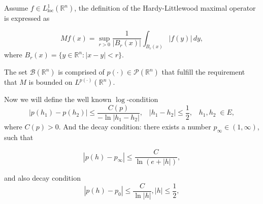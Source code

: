 \documentclass[oneside,reqno]{amsart}
\numberwithin{equation}{section}
\theoremstyle{definition}
\begin{document}
Assume $f\in L_{\mathrm{loc}}^{1}(\mathbb{R}^{n})$, the definition of the Hardy-Littlewood maximal operator is expressed as

$$Mf(x)=\sup_{r>0}\frac{1}{ \vert B_{r}(x) \vert } \int_{B_{r}(x)} \bigl\vert f(y) \bigr\vert \,dy,$$
where $B_{r}(x)=\{y\in\mathbb{R}^{n}:|x-y|< r\}.$


The set $\mathcal{B}(\mathbb{R}^{n})$  is comprised of $p(\cdot)\in\mathcal{P}(\mathbb{R}^{n})$ that fulfill the requirement that $M $ is bounded on  $L^{p(\cdot)}(\mathbb{R}^{n}).$


Now we will define the well known $\log$-condition
\begin{equation}\label{r5}
	{|p(h_1)-p(h_2)|\leq \frac{C(p)}{-\ln|h_1-h_2|}, \;\;\;|h_1-h_2|\leq \frac{1}{2},\; \;\; h_1,h_2\; \in E},
\end{equation}
where $C(p)>0$. And the decay condition: there exists a number $p_\infty \in (1, \infty)$, such that

\begin{equation}\label{r6}
	|p(h)-p_\infty|\leq \frac{C}{\ln(e+|h|)},
\end{equation}


and also decay condition
\begin{equation}\label{r7}
	|p(h)-p_0|\leq \frac{C}{\ln|h|},|h|\leq\frac{1}{2},
\end{equation}
\end{document}
